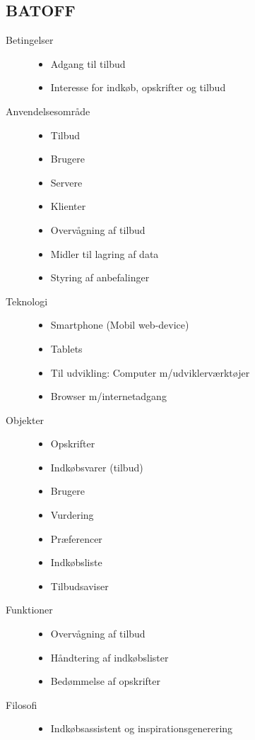 \subsection{BATOFF}
\begin{description}
\item [Betingelser]\hfill
\begin{itemize}[nolistsep,noitemsep]
\item Adgang til tilbud
\item Interesse for indkøb, opskrifter og tilbud
\end{itemize}

\item [Anvendelsesområde]\hfill
\begin{itemize}[nolistsep,noitemsep]
\item Tilbud
\item Brugere
\item Servere
\item Klienter
\item Overvågning af tilbud
\item Midler til lagring af data
\item Styring af anbefalinger
\end{itemize}

\item [Teknologi]\hfill
\begin{itemize}[nolistsep,noitemsep]
\item Smartphone (Mobil web-device)
\item Tablets
\item Til udvikling: Computer m/udviklerværktøjer
\item Browser m/internetadgang
\end{itemize}

\item [Objekter]\hfill
\begin{itemize}[nolistsep,noitemsep]
\item Opskrifter
\item Indkøbsvarer (tilbud)
\item Brugere
\item Vurdering
\item Præferencer
\item Indkøbsliste
\item Tilbudsaviser
\end{itemize}

\item [Funktioner]\hfill
\begin{itemize}[nolistsep,noitemsep]
\item Overvågning af tilbud
\item Håndtering af indkøbslister
\item Bedømmelse af opskrifter
\end{itemize}

\item [Filosofi]\hfill
\begin{itemize}[nolistsep,noitemsep]
\item Indkøbsassistent og inspirationsgenerering
\end{itemize}
\end{description}
